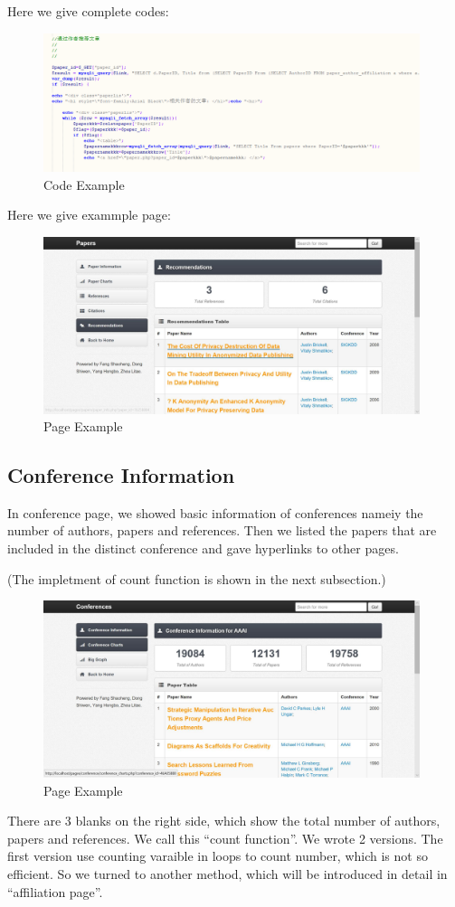 \documentclass{book}
\begin{document}
Here we give complete codes:
\begin{figure}[H]
\centering
\includegraphics[width=11.0cm]{img/yhb_mp_3.png}
\caption{Code Example}
\end{figure}


Here we give exammple page:
\begin{figure}[H]
\centering
\includegraphics[width=11.0cm]{img/yhb_paper_4.jpg}
\caption{Page Example}
\end{figure}



\subsection{Conference Information}

In conference page, we showed basic information of conferences nameiy the number of authors, papers and references. Then we listed the papers that are included in the distinct conference and gave hyperlinks to other pages.

(The impletment of count function is shown in the next subsection.)
\begin{figure}[H]
\centering
\includegraphics[width=11.0cm]{img/yhb_con_2.jpg}
\caption{Page Example}
\end{figure}
There are 3 blanks on the right side, which show the total number of authors, papers and references. We call this ``count function''. We wrote 2 versions. The first version use counting varaible in loops to count number, which is not  so efficient. So we turned to another method, which will be introduced in detail in ``affiliation page''.
\end{document}
